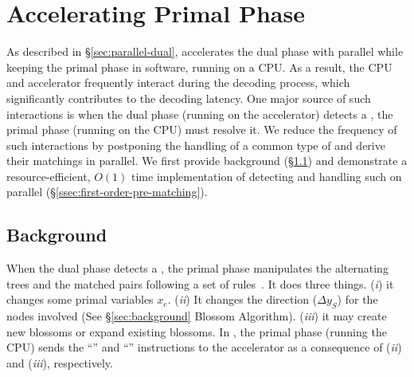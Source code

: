 \section{Accelerating Primal Phase}\label{sec:pre-matching}

As described in \S\ref{sec:parallel-dual}, \arch accelerates the dual phase with parallel \pus while keeping the primal phase in software, running on a CPU. 
As a result,  the CPU and accelerator frequently interact during the decoding process, which significantly contributes to the decoding latency.
One major source of such interactions is when the dual phase (running on the accelerator) detects a \conf, the primal phase (running on the CPU) must resolve it. 
We reduce the frequency of such interactions by postponing the handling of a common type of \confs and derive their matchings in parallel.
We first provide background (\S\ref{ssec:background-matching-patterns}) and demonstrate a resource-efficient, $O(1)$ time implementation of detecting and handling such \confs on parallel \pus (\S\ref{ssec:first-order-pre-matching}).

\subsection{Background}
\label{ssec:background-matching-patterns}

When the dual phase detects a \conf, the primal phase manipulates the alternating trees and the matched pairs following a set of rules~\cite{kolmogorov2009blossom}.
It does three things.
(\emph{i}) it changes some primal variables $x_e$. (\textit{ii}) It changes the direction ($\Delta y_S$) for the nodes involved (See \S\ref{sec:background} Blossom Algorithm). (\textit{iii}) it may create new blossoms or expand existing blossoms.
In \arch, the primal phase (running the CPU) sends the ``'' and ``'' instructions to the accelerator as a consequence of (\textit{ii}) and (\textit{iii}), respectively.

